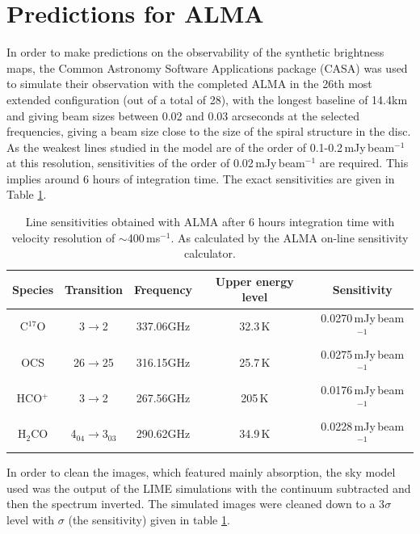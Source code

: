 \documentclass[useAMS,usenatbib]{mn2e}
\begin{document}
\section{Predictions for ALMA} \label{sec:alma_predictions}

In order to make predictions on the observability of the synthetic brightness maps, the Common Astronomy Software Applications package (CASA) was used to simulate their observation with the completed ALMA in the 26th most extended configuration (out of a total of 28), with the longest baseline of 14.4km and giving beam sizes between 0.02 and 0.03 arcseconds at the selected frequencies, giving a beam size close to the size of the spiral structure in the disc. As the weakest lines studied in the model are of the order of 0.1-0.2$\,$mJy$\,$beam$^{-1}$ at this resolution, sensitivities of the order of 0.02$\,$mJy$\,$beam$^{-1}$ are required. This implies around 6 hours of integration time. The exact sensitivities are given in Table \ref{sigmas}.
\begin{table}
  \centering
  \begin{minipage}{80mm}
    \caption{Line sensitivities obtained with ALMA after 6 hours integration time with velocity resolution of $\sim$400$\,$ms$^{-1}$. As calculated by the ALMA on-line sensitivity calculator.}
    \label{sigmas}
    \begin{tabular}{c||c|c|c|c}
      \hline
      Species & Transition & Frequency & Upper energy level & Sensitivity\\
      \hline
      C$^{17}$O & 3$\rightarrow$2 & 337.06GHz & 32.3$\,$K & 0.0270$\,$mJy$\,$beam$^{-1}$ \\
      OCS & 26$\rightarrow$25 & 316.15GHz & 25.7$\,$K & 0.0275$\,$mJy$\,$beam$^{-1}$ \\
      HCO$^+$ & 3$\rightarrow$2 & 267.56GHz & 205$\,$K & 0.0176$\,$mJy$\,$beam$^{-1}$ \\
      H$_2$CO & 4$_{04}\rightarrow$3$_{03}$ &  290.62GHz & 34.9$\,$K & 0.0228$\,$mJy$\,$beam$^{-1}$ \\
      \hline
    \end{tabular}
  \end{minipage}
\end{table}
In order to clean the images, which featured mainly absorption, the sky model used was the output of the LIME simulations with the continuum subtracted and then the spectrum inverted. The simulated images were cleaned down to a 3$\sigma$ level with $\sigma$ (the sensitivity) given in table \ref{sigmas}.\smallskip
\end{document}
